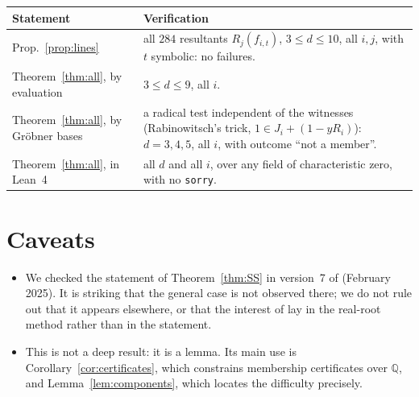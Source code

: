 \documentclass[11pt,reqno]{amsart}
\theoremstyle{plain}
\theoremstyle{definition}
\begin{document}
\begin{center}
\renewcommand{\arraystretch}{1.2}
\begin{tabular}{>{\raggedright\arraybackslash}p{}%
                >{\raggedright\arraybackslash}p{}}
\toprule
Statement & Verification\\
\midrule
Prop.~\ref{prop:lines}
  & all $284$ resultants $R_j(f_{i,t})$, $3\le d\le10$, all $i,j$, with $t$
    symbolic: no failures.\\
Theorem~\ref{thm:all}, by evaluation
  & $3\le d\le9$, all $i$.\\
Theorem~\ref{thm:all}, by Gröbner bases
  & a radical test independent of the witnesses (Rabinowitsch's trick,
    $1\in J_i+(1-yR_i)$): $d=3,4,5$, all $i$, with outcome ``not a member''.\\
Theorem~\ref{thm:all}, in Lean~4
  & all $d$ and all $i$, over any field of characteristic zero, with no
    \texttt{sorry}.\\
\bottomrule
\end{tabular}
\end{center}

\section{Caveats}

\begin{itemize}
\item We checked the statement of Theorem~\ref{thm:SS} in version~7 of \cite{SS}
  (February 2025). It is striking that the general case is not observed there; we
  do not rule out that it appears elsewhere, or that the interest of \cite{SS}
  lay in the real-root method rather than in the statement.
\item This is not a deep result: it is a lemma. Its main use is
  Corollary~\ref{cor:certificates}, which constrains membership certificates over
  $\mathbb{Q}$, and Lemma~\ref{lem:components}, which locates the difficulty
  precisely.
\end{itemize}
\end{document}
